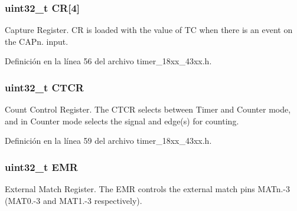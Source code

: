 \subsubsection[{\texorpdfstring{CR}{CR}}]{ uint32\+\_\+t CR\mbox{[}4\mbox{]}}\hypertarget{struct_l_p_c___t_i_m_e_r___t_aea47130033090cb973776372977b302b}{}\label{struct_l_p_c___t_i_m_e_r___t_aea47130033090cb973776372977b302b}
Capture Register. CR is loaded with the value of TC when there is an event on the C\+A\+Pn. input. 

Definición en la línea 56 del archivo timer\+\_\+18xx\+\_\+43xx.\+h.

\subsubsection[{\texorpdfstring{C\+T\+CR}{CTCR}}]{ uint32\+\_\+t C\+T\+CR}\hypertarget{struct_l_p_c___t_i_m_e_r___t_a5cde523b810fab496eb0619abc06764d}{}\label{struct_l_p_c___t_i_m_e_r___t_a5cde523b810fab496eb0619abc06764d}
Count Control Register. The C\+T\+CR selects between Timer and Counter mode, and in Counter mode selects the signal and edge(s) for counting. 

Definición en la línea 59 del archivo timer\+\_\+18xx\+\_\+43xx.\+h.

\subsubsection[{\texorpdfstring{E\+MR}{EMR}}]{ uint32\+\_\+t E\+MR}\hypertarget{struct_l_p_c___t_i_m_e_r___t_a6034c7458d8e6030f6dacecf0f1a3a89}{}\label{struct_l_p_c___t_i_m_e_r___t_a6034c7458d8e6030f6dacecf0f1a3a89}
External Match Register. The E\+MR controls the external match pins M\+A\+Tn.-\/3 (M\+A\+T0.-\/3 and M\+A\+T1.-\/3 respectively). 

